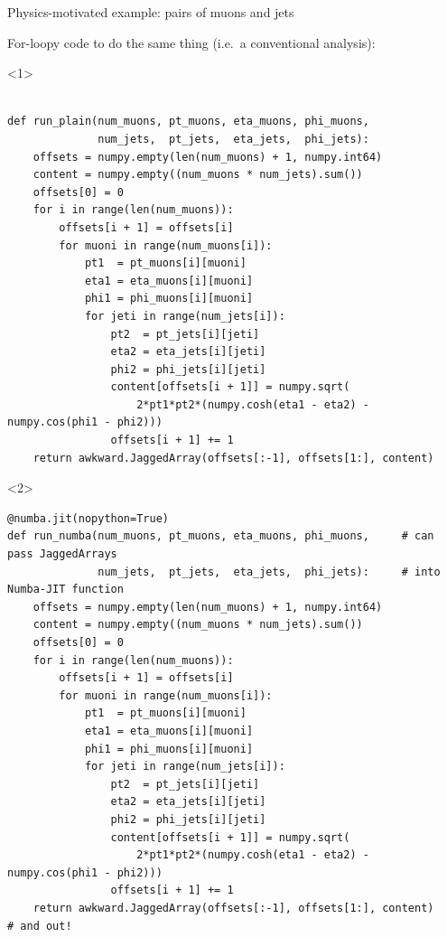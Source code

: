 \documentclass[aspectratio=169]{beamer}
\begin{document}
\begin{frame}[fragile]{Physics-motivated example: pairs of muons and jets}
\vspace{0.25 cm}

{For-loopy code to do the same thing (i.e.\ a conventional analysis):}

\scriptsize
\begin{onlyenv}<1>
\begin{verbatim}

def run_plain(num_muons, pt_muons, eta_muons, phi_muons,
              num_jets,  pt_jets,  eta_jets,  phi_jets):
    offsets = numpy.empty(len(num_muons) + 1, numpy.int64)
    content = numpy.empty((num_muons * num_jets).sum())
    offsets[0] = 0
    for i in range(len(num_muons)):
        offsets[i + 1] = offsets[i]
        for muoni in range(num_muons[i]):
            pt1  = pt_muons[i][muoni]
            eta1 = eta_muons[i][muoni]
            phi1 = phi_muons[i][muoni]
            for jeti in range(num_jets[i]):
                pt2  = pt_jets[i][jeti]
                eta2 = eta_jets[i][jeti]
                phi2 = phi_jets[i][jeti]
                content[offsets[i + 1]] = numpy.sqrt(
                    2*pt1*pt2*(numpy.cosh(eta1 - eta2) - numpy.cos(phi1 - phi2)))
                offsets[i + 1] += 1
    return awkward.JaggedArray(offsets[:-1], offsets[1:], content)
\end{verbatim}
\end{onlyenv}
\begin{onlyenv}<2>
\begin{verbatim}
@numba.jit(nopython=True)
def run_numba(num_muons, pt_muons, eta_muons, phi_muons,     # can pass JaggedArrays
              num_jets,  pt_jets,  eta_jets,  phi_jets):     # into Numba-JIT function
    offsets = numpy.empty(len(num_muons) + 1, numpy.int64)
    content = numpy.empty((num_muons * num_jets).sum())
    offsets[0] = 0
    for i in range(len(num_muons)):
        offsets[i + 1] = offsets[i]
        for muoni in range(num_muons[i]):
            pt1  = pt_muons[i][muoni]
            eta1 = eta_muons[i][muoni]
            phi1 = phi_muons[i][muoni]
            for jeti in range(num_jets[i]):
                pt2  = pt_jets[i][jeti]
                eta2 = eta_jets[i][jeti]
                phi2 = phi_jets[i][jeti]
                content[offsets[i + 1]] = numpy.sqrt(
                    2*pt1*pt2*(numpy.cosh(eta1 - eta2) - numpy.cos(phi1 - phi2)))
                offsets[i + 1] += 1
    return awkward.JaggedArray(offsets[:-1], offsets[1:], content)          # and out!
\end{verbatim}
\end{onlyenv}
\end{frame}
\end{document}
